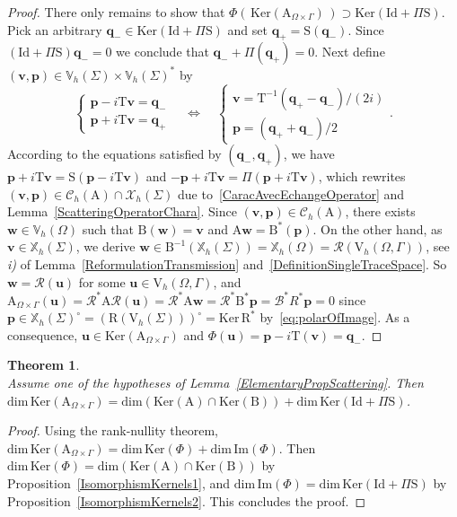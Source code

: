 \documentclass[a4paper,11pt]{article}
\newcommand{\mrm}{\mathrm}
\newcommand{\mA}{\mathrm{A}}
\newcommand{\mB}{\mathrm{B}}
\newcommand{\Id}{\mathrm{Id}}
\newcommand{\mT}{\mathrm{T}}
\newcommand{\mS}{\mathrm{S}}
\newcommand{\mR}{\mathrm{R}}
\newcommand{\mbV}{\mathbb{V}}
\newcommand{\mbX}{\mathbb{X}}
\newcommand{\Vh}{\mathrm{V}_{h}}
\newcommand{\bp}{\boldsymbol{p}}
\newcommand{\bu}{\boldsymbol{u}}
\newcommand{\bv}{\boldsymbol{v}}
\newcommand{\bw}{\boldsymbol{w}}
\newcommand{\bq}{\boldsymbol{q}}
\newtheorem{thm}[defn]{Theorem}
\begin{document}
\begin{proof}
There only remains to show that
$\Phi(\,\mrm{Ker}(\mA_{\Omega\times\Gamma})\,) \supset \mrm{Ker}(\Id +
\Pi\mS)$. Pick an arbitrary $\bq_-\in \mrm{Ker}(\Id + \Pi\mS)$ and
set $\bq_+ = \mS(\bq_-)$. Since $(\Id + \Pi\mS)\bq_- = 0$ we
conclude that $\bq_-+\Pi(\bq_+) = 0$. Next define $(\bv,\bp)\in
\mbV_h(\Sigma)\times \mbV_h(\Sigma)^*$ by
\begin{equation*}
  \left\{
  \begin{array}{l}
    \bp-i\mT\bv = \bq_-\\
    \bp+i\mT\bv = \bq_+
  \end{array}
  \right.
  \quad\iff\quad
  \left\{
  \begin{array}{l}
    \bv = \mT^{-1}(\bq_+ -\bq_-)/(2i)\\
    \bp = (\bq_+ + \bq_-)/2
  \end{array}
  \right.
  .
\end{equation*}
According to the equations satisfied by $(\bq_-,\bq_+)$, we
have $\bp+i\mT\bv = \mS(\bp-i\mT\bv)$ and $-\bp+i\mT\bv =
\Pi(\bp+i\mT\bv)$, which rewrites
$(\bv,\bp)\in\mathscr{C}_h(\mA)\cap\mathscr{X}_h(\Sigma)$ due to~\eqref{CaracAvecEchangeOperator} and Lemma~\ref{ScatteringOperatorChara}.
Since $(\bv,\bp)\in\mathscr{C}_h(\mA)$, there exists $\bw\in
\mbV_h(\Omega)$ such that $\mB(\bw) = \bv$ and $\mA\bw =
\mB^*(\bp)$. On the other hand, as $\bv\in\mbX_h(\Sigma)$, we derive
$\bw\in \mB^{-1}(\mbX_h(\Sigma)) = \mbX_h(\Omega) =
\mathcal{R}(\Vh(\Omega,\Gamma))$, see \textit{i)} of Lemma~\ref{ReformulationTransmission} and~\eqref{DefinitionSingleTraceSpace}. So $\bw = \mathcal{R}(\bu)$ for
some $\bu\in \Vh(\Omega,\Gamma)$, and
$\mA_{\Omega\times\Gamma}(\bu) = \mathcal{R}^*\mA\mathcal{R}(\bu) =
\mathcal{R}^*\mA\bw = \mathcal{R}^*\mB^*\bp = \mathcal{B}^*R^*\bp = 0$ since $\bp\in
\mbX_h(\Sigma)^{\circ} = (\mR(\Vh(\Sigma)))^\circ = \mrm{Ker}\,\mR^*$ by~\eqref{eq:polarOfImage}. As a consequence, $\bu \in
\mrm{Ker}(\mA_{\Omega\times\Gamma})$ and $\Phi(\bu) = \bp-i\mT(\bv) =
\bq_-$. 
\end{proof}

\begin{thm}\label{EquivalenceDimensionResonance}\quad\\
  Assume one of the hypotheses of Lemma~\ref{ElementaryPropScattering}. Then 
  $\mrm{dim}\,\mrm{Ker}(\mA_{\Omega\times\Gamma})
  =\mrm{dim}(\mrm{Ker}(\mA)\cap\mrm{Ker}(\mB) )
  +\mrm{dim}\,\mrm{Ker}(\mrm{Id}+\Pi\mS)$.
\end{thm}
\begin{proof}
Using the rank-nullity theorem, $\mrm{dim}\,\mrm{Ker}(\mA_{\Omega\times\Gamma}) =
\mrm{dim}\,\mrm{Ker}(\Phi) + \mrm{dim}\,\mrm{Im}(\Phi)$. Then
$\mrm{dim}\,\mrm{Ker}(\Phi) =
\mrm{dim}(\mrm{Ker}(\mA)\cap\mrm{Ker}(\mB) )$ by Proposition~\ref{IsomorphismKernels1}, and $\mrm{dim}\,\mrm{Im}(\Phi) =
\mrm{dim}\,\mrm{Ker}(\mrm{Id}+\Pi\mS)$ by Proposition~\ref{IsomorphismKernels2}. This concludes the proof. 
\end{proof}
\end{document}
